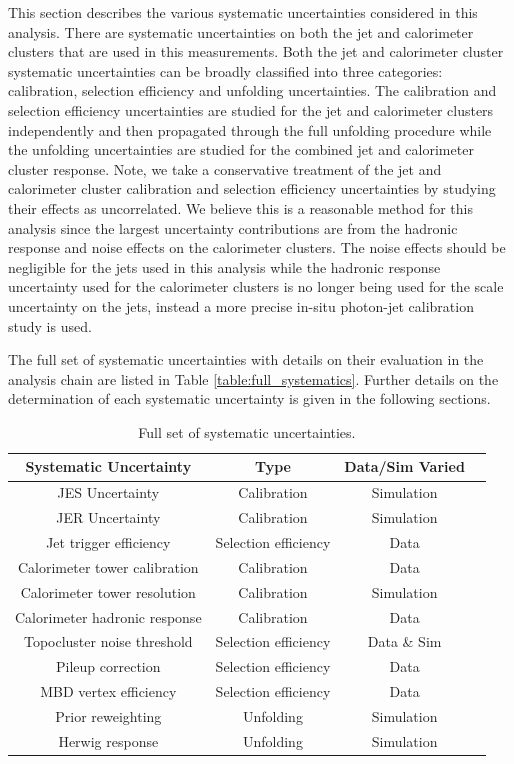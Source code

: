 This section describes the various systematic uncertainties considered in this analysis. 
There are systematic uncertainties on both the jet and calorimeter clusters that are used in this measurements.
Both the jet and calorimeter cluster systematic uncertainties can be broadly classified into three categories: calibration, selection efficiency and unfolding uncertainties.
The calibration and selection efficiency uncertainties are studied for the jet and calorimeter clusters independently and then propagated through the full unfolding procedure while the unfolding uncertainties are studied for the combined jet and calorimeter cluster response. Note, we take a conservative treatment of the jet and calorimeter cluster calibration and selection efficiency uncertainties by studying their effects as uncorrelated. We believe this is a reasonable method for this analysis since the largest uncertainty contributions are from the hadronic response and noise effects on the calorimeter clusters. The noise effects should be negligible for the jets used in this analysis while the hadronic response uncertainty used for the calorimeter clusters is no longer being used for the scale uncertainty on the jets, instead a more precise in-situ photon-jet calibration study is used. 

The full set of systematic uncertainties with details on their evaluation in the analysis chain are listed in Table \ref{table:full_systematics}. Further details on the determination of each systematic uncertainty is given in the following sections. \newline
\begin{table}[ht]
\centering
\begin{tabular}{|c|c|c|c|}
\hline
Systematic Uncertainty & Type & Data/Sim Varied \\ \hline
JES Uncertainty & Calibration & Simulation \\ \hline
JER Uncertainty & Calibration & Simulation \\ \hline
Jet trigger efficiency & Selection efficiency & Data \\ \hline
Calorimeter tower calibration & Calibration & Data \\ \hline
Calorimeter tower resolution & Calibration & Simulation \\ \hline
Calorimeter hadronic response & Calibration & Data \\ \hline
Topocluster noise threshold & Selection efficiency & Data \& Sim \\ \hline
Pileup correction & Selection efficiency & Data \\ \hline
MBD vertex efficiency & Selection efficiency & Data \\ \hline
Prior reweighting & Unfolding & Simulation \\ \hline
Herwig response & Unfolding & Simulation \\ \hline
\end{tabular}
\caption{Full set of systematic uncertainties.}
\end{table}
\label{table:full_systematics}

